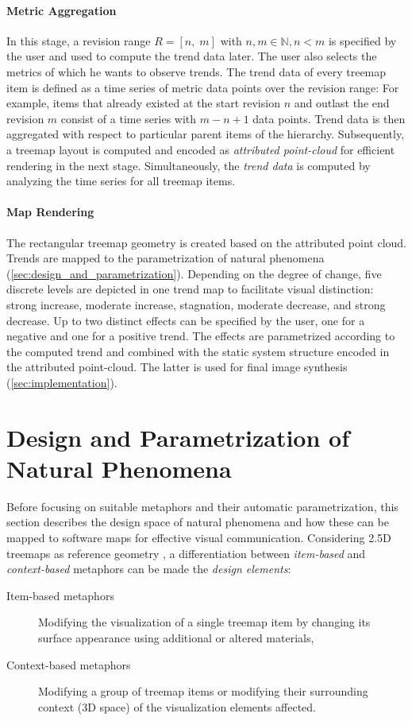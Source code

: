 \paragraph*{Metric Aggregation}
\noindent
In this stage, a revision range $R = [n,\;m]$ with $n,m \in \mathbb{N}, n < m$ is specified by the user and used to compute the trend data later.
The user also selects the metrics of which he wants to observe trends.
The trend data of every treemap item is defined as a time series of metric data points over the revision range: 
For example, items that already existed at the start revision $n$ and outlast the end revision $m$ consist of a time series with $m-n+1$ data points.
Trend data is then aggregated with respect to particular parent items of the hierarchy. 
Subsequently, a treemap layout is computed and encoded as \emph{attributed point-cloud} for efficient rendering in the next stage. 
Simultaneously, the \emph{trend data} is computed by analyzing the time series for all treemap items.

\paragraph*{Map Rendering}
\noindent
The rectangular treemap geometry is created based on the attributed point cloud. 
Trends are mapped to the parametrization of natural phenomena (\autoref{sec:design_and_parametrization}).
Depending on the degree of change, five discrete levels are depicted in one trend map to facilitate visual distinction: strong increase, moderate increase, stagnation, moderate decrease, and strong decrease.
Up to two distinct effects can be specified by the user, one for a negative and one for a positive trend. 
The effects are parametrized according to the computed trend and combined with the static system structure encoded in the attributed point-cloud.
The latter is used for final image synthesis (\autoref{sec:implementation}).

\section{Design and Parametrization of Natural Phenomena}
\label{sec:design_and_parametrization}
\noindent
Before focusing on suitable metaphors and their automatic parametrization, this section describes the design space of natural phenomena and how these can be mapped to software maps for effective visual communication. 
Considering 2.5D treemaps as reference geometry \cite{Duebel2014}, a differentiation between \emph{item-based} and \emph{context-based} metaphors can be made \wrt the \emph{design elements}:
\begin{description}
	
	\item[Item-based metaphors] Modifying the visualization of a single treemap item by changing its surface appearance using additional or altered materials,
	
	\item[Context-based metaphors] Modifying a group of treemap items or modifying their surrounding context (3D space) of the visualization elements affected.
	
\end{description}

